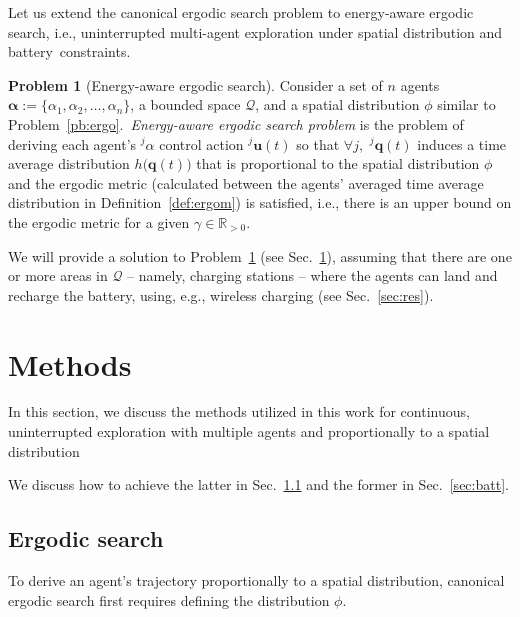 \documentclass[letterpaper,10pt,conference,twoside]{IEEEtran}
\theoremstyle{definition}
\newtheorem{pb}{Problem}[section]
\begin{document}
Let us extend the canonical ergodic search problem to energy-aware ergodic search, i.e., uninterrupted multi-agent exploration %
under spatial distribution and battery~constraints.

\begin{pb}[Energy-aware ergodic search]\label{pb:enerergo}
  Consider a set of $n$ agents $\boldsymbol{\alpha}:=\{\alpha_1,\alpha_2,\dots,\alpha_n\}$, a bounded space $\mathcal{Q}$, and a spatial distribution $\phi$ similar to Problem~\ref{pb:ergo}.~\textit{Energy-aware ergodic search problem} is the problem of deriving each agent's ${}^j\alpha$ control action ${}^j\mathbf{u}(t)$ so that $\forall j,\,\,{}^j\mathbf{q}(t)$ induces a time average distribution $h\big(\mathbf{q}(t)\big)$ that is proportional to the spatial distribution $\phi$ and %
  the ergodic metric (calculated between the agents' averaged time average distribution in Definition~\ref{def:ergom}) is satisfied, i.e., there is an upper bound on the ergodic metric 
  for a given $\gamma\in\mathbb{R}_{>0}$.%
\end{pb}

We will provide a solution to Problem~\ref{pb:enerergo} (see Sec.~\ref{sec:meth}), assuming that there are one or more areas in $\mathcal{Q}$ -- namely, charging stations -- where the agents can land and recharge the battery, using, e.g., wireless charging (see Sec.~\ref{sec:res}). 


\section{Methods}\label{sec:meth}
\noindent
In this section, we discuss the methods utilized in this work for continuous, uninterrupted exploration with multiple agents and proportionally to a spatial distribution

We discuss how to achieve the latter in Sec.~\ref{sec:ergosearch} and the former in Sec.~\ref{sec:batt}.

\subsection{Ergodic search}\label{sec:ergosearch}
\noindent
To derive an agent's trajectory proportionally to a spatial distribution, canonical ergodic search first requires defining the distribution $\phi$.
\end{document}
